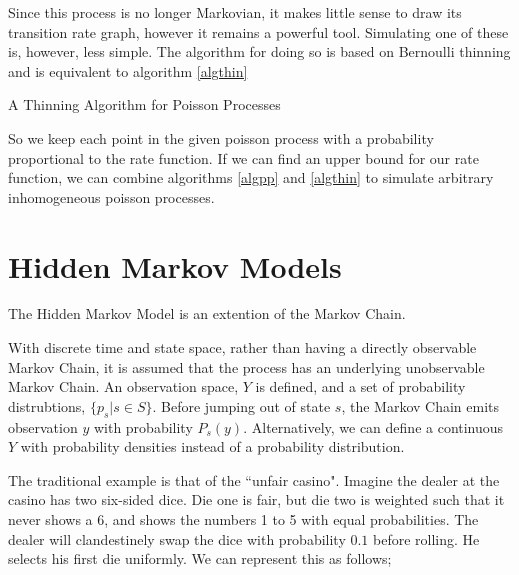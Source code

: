 Since this process is no longer Markovian, it makes little sense to draw its transition rate graph, however it remains a powerful tool. Simulating one of these is, however, less simple. The algorithm for doing so is based on Bernoulli thinning \cite{thinning} and is equivalent to algorithm \ref{algthin}

\begin{algorithm}
\SetAlgoLined
{}

\caption{A Thinning Algorithm for Poisson Processes}\label{algthin}

\end{algorithm}

So we keep each point in the given poisson process with a probability proportional to the rate function. If we can find an upper bound for our rate function, we can combine algorithms \ref{algpp} and \ref{algthin} to simulate arbitrary inhomogeneous poisson processes.

\section{Hidden Markov Models}

The Hidden Markov Model is an extention of the Markov Chain.

With discrete time and state space, rather than having a directly observable Markov Chain, it is assumed that the process has an underlying unobservable Markov Chain. An observation space, $Y$ is defined, and a set of probability distrubtions, $\{p_s | s \in S\}$. Before jumping out of state $s$, the Markov Chain emits observation $y$ with probability $P_s(y)$. Alternatively, we can define a continuous $Y$ with probability densities instead of a probability distribution.

The traditional example is that of the ``unfair casino". Imagine the dealer at the casino has two six-sided dice. Die one is fair, but die two is weighted such that it never shows a 6, and shows the numbers 1 to 5 with equal probabilities. The dealer will clandestinely swap the dice with probability $0.1$ before rolling. He selects his first die uniformly. We can represent this as follows;

